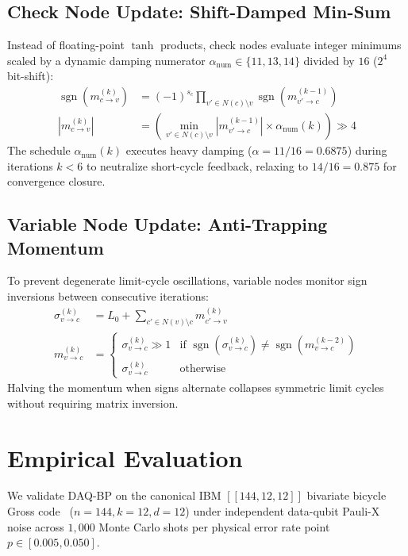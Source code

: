 \documentclass[aps,prxquantum,reprint,twocolumn,superscriptaddress,nofootinbib]{revtex4-2}
\begin{document}
\subsection{Check Node Update: Shift-Damped Min-Sum}
Instead of floating-point $\tanh$ products, check nodes evaluate integer minimums scaled by a dynamic damping numerator $\alpha_{\text{num}} \in \{11, 13, 14\}$ divided by $16$ ($2^4$ bit-shift):
\begin{align}
    \operatorname{sgn}(m_{c \to v}^{(k)}) &= (-1)^{s_c} \prod_{v' \in N(c) \setminus v} \operatorname{sgn}(m_{v' \to c}^{(k-1)}) \\
    |m_{c \to v}^{(k)}| &= \left( \min_{v' \in N(c) \setminus v} |m_{v' \to c}^{(k-1)}| \times \alpha_{\text{num}}(k) \right) \gg 4
\end{align}
The schedule $\alpha_{\text{num}}(k)$ executes heavy damping ($\alpha = 11/16 = 0.6875$) during iterations $k < 6$ to neutralize short-cycle feedback, relaxing to $14/16 = 0.875$ for convergence closure.

\subsection{Variable Node Update: Anti-Trapping Momentum}
To prevent degenerate limit-cycle oscillations, variable nodes monitor sign inversions between consecutive iterations:
\begin{align}
    \sigma_{v \to c}^{(k)} &= L_0 + \sum_{c' \in N(v) \setminus c} m_{c' \to v}^{(k)} \\
    m_{v \to c}^{(k)} &= \begin{cases} 
        \sigma_{v \to c}^{(k)} \gg 1 & \text{if } \operatorname{sgn}(\sigma_{v \to c}^{(k)}) \neq \operatorname{sgn}(m_{v \to c}^{(k-2)}) \\
        \sigma_{v \to c}^{(k)} & \text{otherwise}
    \end{cases}
\end{align}
Halving the momentum when signs alternate collapses symmetric limit cycles without requiring matrix inversion.

\section{Empirical Evaluation}

We validate DAQ-BP on the canonical IBM $[[144, 12, 12]]$ bivariate bicycle Gross code~\cite{bravyi2024high} ($n=144, k=12, d=12$) under independent data-qubit Pauli-X noise across $1,000$ Monte Carlo shots per physical error rate point $p \in [0.005, 0.050]$.
\end{document}
